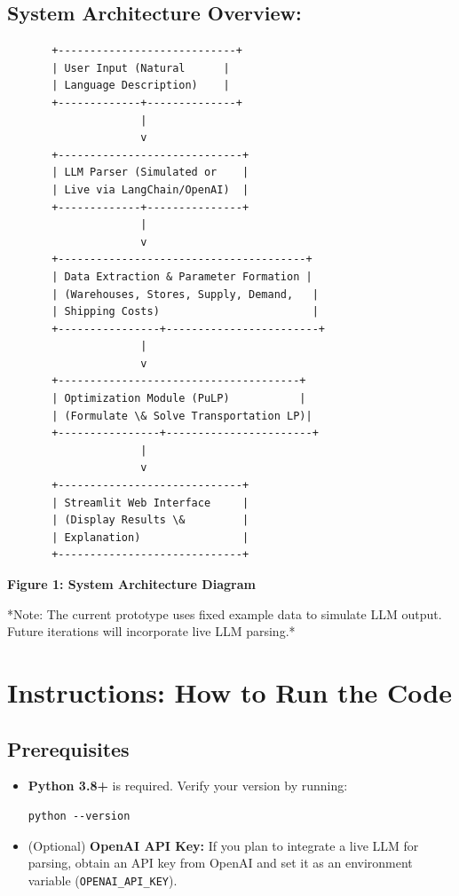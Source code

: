 \documentclass[11pt]{article}
\begin{document}
\subsection*{System Architecture Overview:}
\begin{center}
\begin{verbatim}
       +----------------------------+
       | User Input (Natural      |
       | Language Description)    |
       +-------------+--------------+
                     |
                     v
       +-----------------------------+
       | LLM Parser (Simulated or    |
       | Live via LangChain/OpenAI)  |
       +-------------+---------------+
                     |
                     v
       +---------------------------------------+
       | Data Extraction & Parameter Formation |
       | (Warehouses, Stores, Supply, Demand,   |
       | Shipping Costs)                        |
       +----------------+------------------------+
                     |
                     v
       +--------------------------------------+
       | Optimization Module (PuLP)           |
       | (Formulate \& Solve Transportation LP)|
       +----------------+-----------------------+
                     |
                     v
       +-----------------------------+
       | Streamlit Web Interface     |
       | (Display Results \&         |
       | Explanation)                |
       +-----------------------------+
\end{verbatim}
\textbf{Figure 1: System Architecture Diagram}
\end{center}

*Note: The current prototype uses fixed example data to simulate LLM output. Future iterations will incorporate live LLM parsing.*

\section{Instructions: How to Run the Code}
\subsection*{Prerequisites}
\begin{itemize}
    \item \textbf{Python 3.8+} is required. Verify your version by running:
    \begin{verbatim}
python --version
    \end{verbatim}
    \item (Optional) \textbf{OpenAI API Key:} If you plan to integrate a live LLM for parsing, obtain an API key from OpenAI and set it as an environment variable (\texttt{OPENAI_API_KEY}).
\end{itemize}
\end{document}
